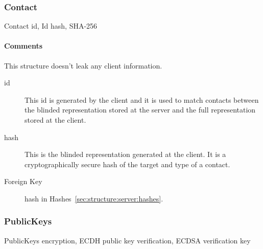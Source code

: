 \documentclass[a4paper,10pt]{article}
\begin{document}
\subsubsection{Contact}
\label{sec:structure:server:contact}

\begin{verbbox}
Contact
{
  id, Id
  hash, SHA-256
}
\end{verbbox}
\begin{center}
\theverbbox
\end{center}

\begin{inparaitem}[ ]
 \item \infrastructure
\end{inparaitem}

\paragraph*{Comments}
This structure doesn't leak any client information.

\SpecialItem
\begin{description}
 \item[id] This id is generated by the client and it is used to match contacts between the blinded representation stored at the server and the full representation stored at the 
client.
 \item[hash] This is the blinded representation generated at the client. It is a cryptographically secure hash of the target and type of a contact.
\end{description}

\SpecialItem
\begin{description}
 \item[Foreign Key] hash in Hashes~\ref{sec:structure:server:hashes}.
\end{description}

\subsubsection{PublicKeys}

\begin{verbbox}
PublicKeys
{
  encryption, ECDH public key
  verification, ECDSA verification key
}
\end{verbbox}
\begin{center}
\theverbbox
\end{center}

\begin{inparaitem}[ ]
 \item \infrastructure
\end{inparaitem}
\end{document}
